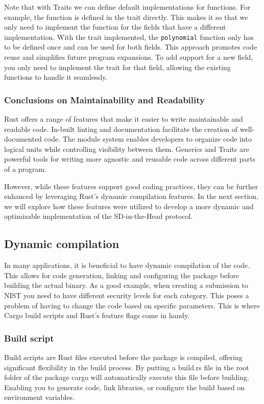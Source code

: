 \documentclass[twoside,11pt]{report}
\theoremstyle{definition}
\theoremstyle{plain}
\begin{document}
Note that with Traits we can define default implementations for functions. For example, the  function is defined in the trait directly. This makes it so that we only need to implement the function for the fields that have a different implementation. With the trait implemented, the \texttt{polynomial} function only has to be defined once and can be used for both fields. This approach promotes code reuse and simplifies future program expansions. To add support for a new field, you only need to implement the  trait for that field, allowing the existing functions to handle it seamlessly.

\subsubsection*{Conclusions on Maintainability and Readability}
Rust offers a range of features that make it easier to write maintainable and readable code. In-built linting and documentation facilitate the creation of well-documented code. The module system enables developers to organize code into logical units while controlling visibility between them. Generics and Traits are powerful tools for writing more agnostic and reusable code across different parts of a program.

However, while these features support good coding practices, they can be further enhanced by leveraging Rust's dynamic compilation features. In the next section, we will explore how these features were utilized to develop a more dynamic and optimizable implementation of the SD-in-the-Head protocol.

\subsection{Dynamic compilation}
In many applications, it is beneficial to have dynamic compilation of the code. This allows for code generation, linking and configuring the package before building the actual binary. As a good example, when creating a submission to NIST you need to have different security levels for each category. This poses a problem of having to change the code based on specific parameters. This is where Cargo build scripts and Rust's feature flags come in handy.

\subsubsection{Build script}
Build scripts are Rust files executed before the package is compiled, offering significant flexibility in the build process. By putting a build.rs file in the root folder of the package cargo will automatically execute this file before building. Enabling you to generate code, link libraries, or configure the build based on environment variables.
\end{document}

